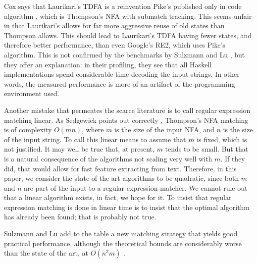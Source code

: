 \documentclass[english]{sigplanconf}
\theoremstyle{definition}
\newcommand{\ra}{$\rightarrow$}
\newcommand{\del}[1]{\textcolor{red}{\sout{#1}}} %
\newcommand{\chg}[2]{\textcolor{red}{\sout{#1}}{\ra}\textcolor{blue}{\uline{#2}}} %
\newcommand{\del}[1]{} %
\newcommand{\chg}[2]{#2}
\renewcommand{\del}[1]{} %
\renewcommand{\chg}[2]{#2} %
\begin{document}
Cox says that Laurikari's TDFA is a reinvention Pike's published only
in code algorithm \cite{Pike87a}, which is Thompson's NFA with submatch
tracking. This seems unfair in that Laurikari's allows for far more
aggressive \chg{reusing}{reuse} of old states than \del{what} Thompson allows. This should
lead to Laurikari's TDFA having fewer states, and therefore better
performance, than even Google's RE2, which uses Pike's algorithm.
This is not confirmed by the benchmarks by Sulzmann and Lu \cite{Sulz12a},
but they offer an explanation: in their profiling, they see that all
Haskell implementations spend considerable time decoding the input
strings. In other words, the measured performance is more of an artifact
of the programming environment used. 

Another mistake that permeates the scarce literature is to call regular
expression matching linear. As Sedgewick points out correctly \cite{Sedg90a},
Thompson's NFA matching is of complexity $O(mn)$, where $m$ is the
size of the input NFA, and $n$ is the size of the input string. To
call this linear means to assume that $m$ is fixed, which is not justified. It may well be true that, at present,
$m$ tends to be small. But that is a natural consequence of the algorithms
not scaling very well with $m$. If they did, that would allow for
fast feature extracting from text. Therefore, in this paper, we consider
the state of the art algorithms to be quadratic, since both $m$ and
$n$ are part of the input to a regular expression matcher. We cannot
rule out that a linear algorithm exists, in fact, we hope for it.
To insist that regular expression matching is done in linear time
is to insist that the optimal algorithm has already been found; that
is probably not true.

Sulzmann and Lu add to the table a new matching strategy that yields
good practical performance, although the theoretical bounds are considerably
worse than the state of the art, at $O(n^{2}m)$ \cite{Sulz12a}.



\end{document}
